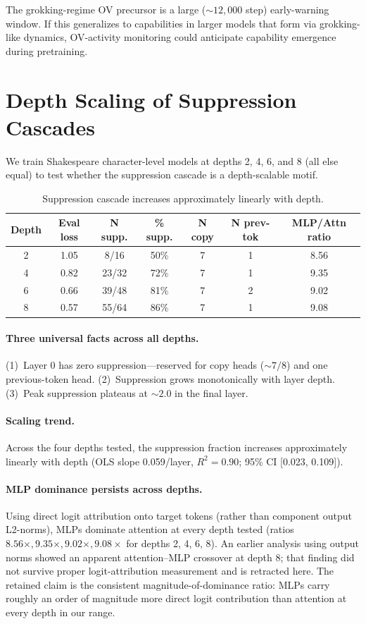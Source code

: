 \documentclass[final]{article}
\begin{document}
The grokking-regime OV precursor is a large (${\sim}12{,}000$ step)
early-warning window. If this generalizes to capabilities in larger models that
form via grokking-like dynamics, OV-activity monitoring could anticipate
capability emergence during pretraining.

\section{Depth Scaling of Suppression Cascades}
\label{sec:depth}

We train Shakespeare character-level models at depths 2, 4, 6, and 8 (all else
equal) to test whether the suppression cascade is a depth-scalable motif.

\begin{table}[h]
\centering
\caption{Suppression cascade increases approximately linearly with depth.}
\label{tab:depth}
\begin{tabular}{ccccccc}
\toprule
Depth & Eval loss & N supp. & \% supp. & N copy & N prev-tok & MLP/Attn ratio \\
\midrule
2 & 1.05 & 8/16  & 50\% & 7 & 1 & 8.56 \\
4 & 0.82 & 23/32 & 72\% & 7 & 1 & 9.35 \\
6 & 0.66 & 39/48 & 81\% & 7 & 2 & 9.02 \\
8 & 0.57 & 55/64 & 86\% & 7 & 1 & 9.08 \\
\bottomrule
\end{tabular}
\end{table}

\paragraph{Three universal facts across all depths.}
(1)~Layer 0 has zero suppression---reserved for copy heads (${\sim}7/8$) and
one previous-token head. (2)~Suppression grows monotonically with layer depth.
(3)~Peak suppression plateaus at ${\sim}2.0$ in the final layer.

\paragraph{Scaling trend.}
Across the four depths tested, the suppression fraction increases approximately
linearly with depth (OLS slope 0.059/layer,
$R^2 = 0.90$; 95\% CI [0.023, 0.109]).

\paragraph{MLP dominance persists across depths.}
Using direct logit attribution onto target tokens (rather than component output
L2-norms), MLPs dominate attention at every depth tested (ratios
$8.56\times, 9.35\times, 9.02\times, 9.08\times$ for depths 2, 4, 6, 8). An
earlier analysis using output norms showed an apparent attention--MLP crossover
at depth 8; that finding did not survive proper logit-attribution measurement
and is retracted here. The retained claim is the consistent magnitude-of-dominance
ratio: MLPs carry roughly an order of magnitude more direct logit contribution
than attention at every depth in our range.
\end{document}
